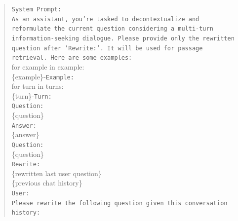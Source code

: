 \begin{quote}
    \texttt{System Prompt:}\\
    \texttt{As an assistant, you're tasked to decontextualize and reformulate the current question considering a multi-turn information-seeking dialogue. Please provide only the rewritten question after 'Rewrite:'. It will be used for passage retrieval. Here are some examples:} \\
    for example in example:\\
    \hspace*{1cm}\{example\}-\texttt{Example:} \\
    \hspace*{1cm}for turn in turns:\\
    \hspace*{1cm}\hspace*{1cm}\{turn\}-\texttt{Turn:} \\
    \hspace*{1cm}\hspace*{1cm}\texttt{Question:} \\
    \hspace*{1cm}\hspace*{1cm}\{question\} \\
    \hspace*{1cm}\hspace*{1cm}\texttt{Answer:} \\
    \hspace*{1cm}\hspace*{1cm}\{answer\} \\
    \hspace*{1cm}\texttt{Question:} \\
    \hspace*{1cm}\{question\} \\
    \hspace*{1cm}\texttt{Rewrite:} \\
    \hspace*{1cm}\{rewritten last user question\} \\
    \{previous chat history\} \\
    \texttt{User:}\\
    \texttt{Please rewrite the following question given this conversation history:}\\

\end{quote}
